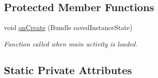 \subsection*{Protected Member Functions}
\begin{DoxyCompactItemize}
\item 
void \hyperlink{classcom_1_1jack_1_1motorbikestatistics_1_1_main_activity_a69fd97053d686c295dc2c58d5c4ffb79}{on\+Create} (Bundle saved\+Instance\+State)
\begin{DoxyCompactList}\small\item\em Function called when main activity is loaded. \end{DoxyCompactList}\end{DoxyCompactItemize}
\subsection*{Static Private Attributes}
